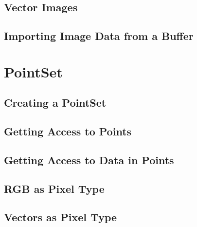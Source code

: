 \label{sec:DefiningRGBImages}
%


\subsection{Vector Images}

%


\subsection{Importing Image Data from a Buffer}
\label{sec:ImportingImageDataFromABuffer}
%



\section{PointSet}
\label{PointSetSection}

\subsection{Creating a PointSet}
\label{sec:CreatingAPointSet}

%



\subsection{Getting Access to Points}
\label{sec:GettingAccessToPointsInThePointSet}

%



\subsection{Getting Access to Data in Points}
\label{sec:GettingAccessToDataInThePointSet}

%



\subsection{RGB as Pixel Type}
\label{sec:PointSetWithRGBAsPixelType}

%




\subsection{Vectors as Pixel Type}
\label{sec:PointSetWithVectorsAsPixelType}

